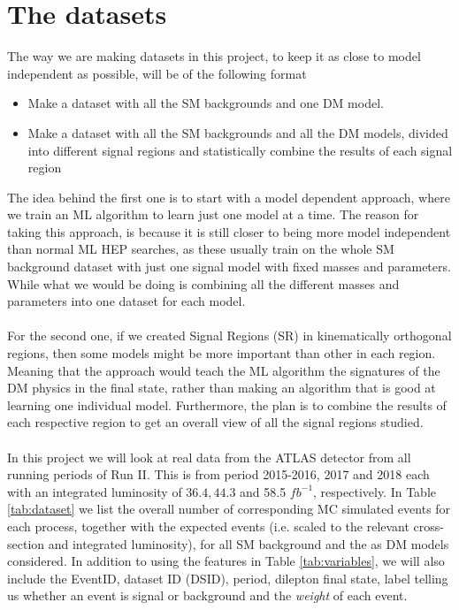 \documentclass[12pt, a4paper]{book}
\begin{document}
\section{The datasets}
The way we are making datasets in this project, to keep it as close to model independent as possible, will be of the following format
\begin{itemize}
   \item Make a dataset with all the SM backgrounds and one DM model.
   \item Make a dataset with all the SM backgrounds and all the DM models, divided into different signal regions and statistically combine the results of each signal region
\end{itemize}
The idea behind the first one is to start with a model dependent approach, where we train an ML algorithm to learn just one model at a time. The reason for taking this approach, is because it is still closer to being more model independent than normal ML HEP searches, as these usually train on the whole SM background dataset with just one 
signal model with fixed masses and parameters. While what we would be doing is combining all the different masses and parameters into one dataset for each model.\\
\\For the second one, if we created Signal Regions (SR) in kinematically orthogonal regions, then some models might be more important than other in each region. Meaning that the approach would teach the ML algorithm the signatures of the DM physics in the final state, rather than making an algorithm that is good at learning one individual model.
Furthermore, the plan is to combine the results of each respective region to get an overall view of all the signal regions studied.\\
\\In this project we will look at real data from the ATLAS detector from all running periods of Run II. This is from period 2015-2016, 2017 and 2018 each with an integrated luminosity of $36.4, 44.3$ and 58.5 $fb^{-1}$, respectively. 
In Table \ref{tab:dataset} we list the overall number of corresponding MC simulated events for each process, together with the expected events (i.e. scaled to the relevant cross-section and integrated luminosity), for all SM background and the as DM models considered. In addition to using the features in Table \ref{tab:variables}, we will also include the EventID, dataset ID (DSID), period, 
dilepton final state, label telling us whether an event is signal or background and the \textit{weight} of each event.
\end{document}
